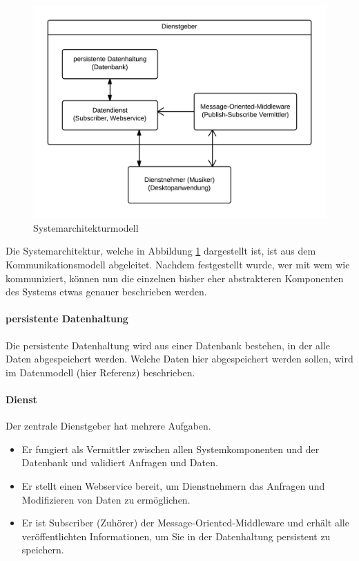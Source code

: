 \documentclass[12pt]{scrartcl}
\begin{document}
\begin{figure}
\centering
\includegraphics[scale=.25]{figures/systemarchitekturmodell}
\caption{Systemarchitekturmodell}
\label{fig:systemarchitekturmodell}
\end{figure}

Die Systemarchitektur, welche in Abbildung \ref{fig:systemarchitekturmodell} dargestellt ist, ist aus dem Kommunikationsmodell abgeleitet. Nachdem festgestellt wurde, wer mit wem wie kommuniziert, können nun die einzelnen bisher eher abstrakteren Komponenten des Systems etwas genauer beschrieben werden.

\paragraph{persistente Datenhaltung}
Die persistente Datenhaltung wird aus einer Datenbank bestehen, in der alle Daten abgespeichert werden. Welche Daten hier abgespeichert werden sollen, wird im Datenmodell (hier Referenz) beschrieben.

\paragraph{Dienst}
Der zentrale Dienstgeber hat mehrere Aufgaben.
\begin{itemize}
\item Er fungiert als Vermittler zwischen allen Systemkomponenten und der Datenbank und validiert Anfragen und Daten.
\item Er stellt einen Webservice bereit, um Dienstnehmern das Anfragen und Modifizieren von Daten zu ermöglichen.
\item Er ist Subscriber (Zuhörer) der Message-Oriented-Middleware und erhält alle veröffentlichten Informationen, um Sie in der Datenhaltung persistent zu speichern.
\end{itemize}
\end{document}
